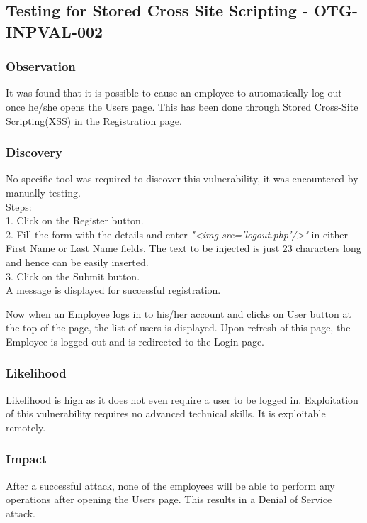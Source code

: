\subsection{Testing for Stored Cross Site Scripting - OTG-INPVAL-002}\label{stored_xss}

\subsubsection{Observation}
It was found that it is possible to cause an employee to automatically log out once he/she opens the Users page. This has been done through Stored Cross-Site Scripting(XSS) in the Registration page.

\subsubsection{Discovery}
No specific tool was required to discover this vulnerability, it was encountered by manually testing.\\
Steps: \\
1. Click on the Register button. \\
2. Fill the form with the details and enter \textit{"<img src='logout.php'/>"} in either First Name or Last Name fields. The text to be injected is just 23 characters long and hence can be easily inserted.\\
3. Click on the Submit button. \\
A message is displayed for successful registration.

Now when an Employee logs in to his/her account and clicks on User button at the top of the page, the list of users is displayed. Upon refresh of this page, the Employee is logged out and is redirected to the Login page.

\subsubsection{Likelihood}
Likelihood is high as it does not even require a user to be logged in.
Exploitation of this vulnerability requires no advanced technical skills. It is exploitable remotely.

\subsubsection{Impact}
After a successful attack, none of the employees will be able to perform any operations after opening the Users page. This results in a Denial of Service attack.

